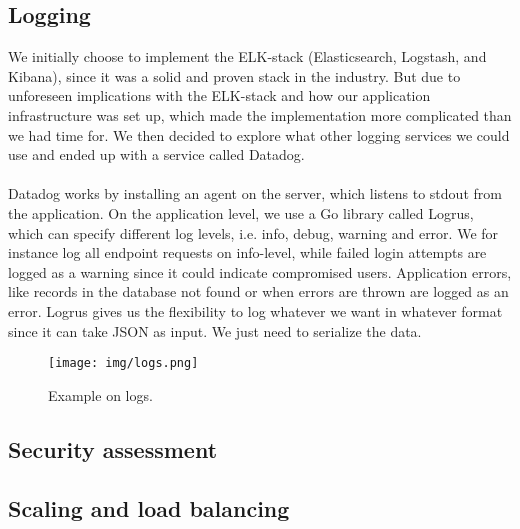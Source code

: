 \subsection{Logging}
We initially choose to implement the ELK-stack (Elasticsearch, Logstash, and Kibana), since it was a solid and proven stack in the industry. But due to unforeseen implications with the ELK-stack and how our application infrastructure was set up, which made the implementation more complicated than we had time for. We then decided to explore what other logging services we could use and ended up with a service called Datadog.
\\\\
Datadog works by installing an agent on the server, which listens to stdout from the application. On the application level, we use a Go library called Logrus, which can specify different log levels, i.e. info, debug, warning and error. We for instance log all endpoint requests on info-level, while failed login attempts are logged as a warning since it could indicate compromised users. Application errors, like records in the database not found or when errors are thrown are logged as an error.  Logrus gives us the flexibility to log whatever we want in whatever format since it can take JSON as input. We just need to serialize the data.
\begin{figure}[h!]
    \centering
    \texttt{[image: img/logs.png]}
    \caption{Example on logs.}   
    \label{fig:log_example}
\end{figure}

\subsection{Security assessment}
\subsection{Scaling and load balancing}
